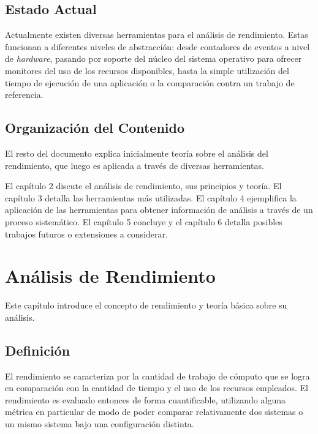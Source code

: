 \documentclass[a4paper]{report}
\begin{document}
\section{Estado Actual}

Actualmente existen diversas herramientas para el an\'alisis de rendimiento.
Estas funcionan a diferentes niveles de abstracci\'on: desde contadores de eventos
a nivel de {\it hardware}, pasando por soporte del n\'ucleo del sistema operativo para ofrecer
monitores del uso de los recursos disponibles, hasta la
simple utilizaci\'on del tiempo de ejecuci\'on de una aplicaci\'on o la comparaci\'on contra un trabajo de referencia.

\section{Organizaci\'on del Contenido}

El resto del documento explica inicialmente teor\'ia sobre el an\'alisis del rendimiento, que luego es
aplicada a trav\'es de diversas herramientas.

\bigskip

El cap\'itulo 2 discute el an\'alisis de rendimiento, sus
principios y teor\'ia. El cap\'itulo 3 detalla las herramientas m\'as
utilizadas. El cap\'itulo 4 ejemplifica la aplicaci\'on de las herramientas
para obtener informaci\'on de an\'alisis a trav\'es de un proceso sistem\'atico.
El cap\'itulo 5 concluye y el cap\'itulo 6 detalla posibles trabajos futuros o extensiones a considerar.

\chapter{An\'alisis de Rendimiento}

Este cap\'itulo introduce el concepto de rendimiento y teor\'ia b\'asica sobre su an\'alisis.

\section{Definici\'on}

El rendimiento se caracteriza por la cantidad de trabajo de c\'omputo que se
logra en comparaci\'on con la cantidad de tiempo y el uso de los recursos  empleados.
El rendimiento es evaluado entonces de forma cuantificable, utilizando alguna
m\'etrica en particular de modo de poder comparar relativamente dos sistemas o
un mismo sistema bajo una configuraci\'on distinta.
\end{document}
